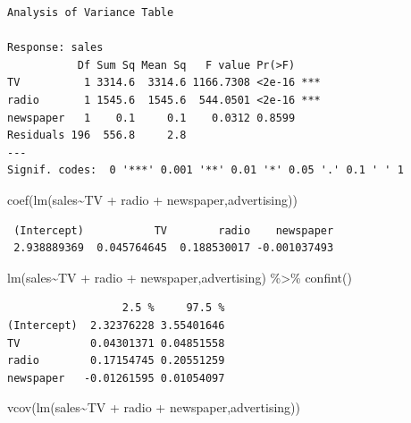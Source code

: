 \documentclass[
  letterpaper,
  DIV=11,
  numbers=noendperiod]{scrreprt}
\newenvironment{Shaded}{\begin{snugshade}}{\end{snugshade}}
\newcommand{\FunctionTok}[1]{\textcolor[rgb]{0.02,0.16,0.49}{#1}}
\newcommand{\NormalTok}[1]{\textcolor[rgb]{0.33,0.33,0.33}{#1}}
\newcommand{\SpecialCharTok}[1]{\textcolor[rgb]{0.00,0.46,0.62}{#1}}
\begin{document}
\begin{verbatim}
Analysis of Variance Table

Response: sales
           Df Sum Sq Mean Sq   F value Pr(>F)    
TV          1 3314.6  3314.6 1166.7308 <2e-16 ***
radio       1 1545.6  1545.6  544.0501 <2e-16 ***
newspaper   1    0.1     0.1    0.0312 0.8599    
Residuals 196  556.8     2.8                     
---
Signif. codes:  0 '***' 0.001 '**' 0.01 '*' 0.05 '.' 0.1 ' ' 1
\end{verbatim}

\begin{Shaded}
\begin{Highlighting}[]
\FunctionTok{coef}\NormalTok{(}\FunctionTok{lm}\NormalTok{(sales}\SpecialCharTok{\textasciitilde{}}\NormalTok{TV }\SpecialCharTok{+}\NormalTok{ radio }\SpecialCharTok{+}\NormalTok{ newspaper,advertising))}
\end{Highlighting}
\end{Shaded}

\begin{verbatim}
 (Intercept)           TV        radio    newspaper 
 2.938889369  0.045764645  0.188530017 -0.001037493 
\end{verbatim}

\begin{Shaded}
\begin{Highlighting}[]
\FunctionTok{lm}\NormalTok{(sales}\SpecialCharTok{\textasciitilde{}}\NormalTok{TV }\SpecialCharTok{+}\NormalTok{ radio }\SpecialCharTok{+}\NormalTok{ newspaper,advertising) }\SpecialCharTok{\%\textgreater{}\%} \FunctionTok{confint}\NormalTok{()}
\end{Highlighting}
\end{Shaded}

\begin{verbatim}
                  2.5 %     97.5 %
(Intercept)  2.32376228 3.55401646
TV           0.04301371 0.04851558
radio        0.17154745 0.20551259
newspaper   -0.01261595 0.01054097
\end{verbatim}

\begin{Shaded}
\begin{Highlighting}[]
\FunctionTok{vcov}\NormalTok{(}\FunctionTok{lm}\NormalTok{(sales}\SpecialCharTok{\textasciitilde{}}\NormalTok{TV }\SpecialCharTok{+}\NormalTok{ radio }\SpecialCharTok{+}\NormalTok{ newspaper,advertising))}
\end{Highlighting}
\end{Shaded}
\end{document}

